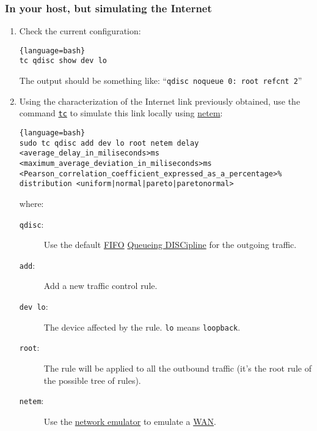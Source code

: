 \subsubsection{In your host, but simulating the Internet}

\begin{enumerate}

\item Check the current configuration:
  
  \begin{lstlisting}{language=bash}
tc qdisc show dev lo
  \end{lstlisting}
  
  The output should be something like: ``\texttt{qdisc noqueue 0: root
    refcnt 2}''
  
\item Using the characterization of the Internet link previously
  obtained, use the command
  \href{https://man7.org/linux/man-pages/man8/tc.8.html}{\texttt{tc}}
  to simulate this link locally using
  \href{https://man7.org/linux/man-pages/man8/tc-netem.8.html}{netem}:

  \begin{lstlisting}{language=bash}
sudo tc qdisc add dev lo root netem delay <average_delay_in_miliseconds>ms <maximum_average_deviation_in_miliseconds>ms <Pearson_correlation_coefficient_expressed_as_a_percentage>% distribution <uniform|normal|pareto|paretonormal>
  \end{lstlisting}
  where:
  \begin{description}
  \item [\texttt{qdisc}:] Use the default
    \href{https://en.wikipedia.org/wiki/FIFO_(computing_and_electronics)}{FIFO}
    \href{https://wiki.debian.org/TrafficControl}{Queueing DISCipline}
    for the outgoing traffic.
  \item [\texttt{add}:] Add a new traffic control rule.
  \item [\texttt{dev lo}:] The device affected by the
    rule. \verb|lo| means \verb|loopback|.
  \item [\texttt{root}:] The rule will be applied to all the outbound
    traffic (it's the root rule of the possible tree of rules).
  \item [\texttt{netem}:] Use the
    \href{https://wiki.linuxfoundation.org/networking/netem}{network
      emulator} to emulate a
    \href{https://en.wikipedia.org/wiki/Wide_area_network}{WAN}.
  \end{description}


\end{enumerate}
